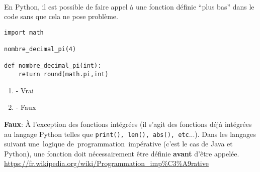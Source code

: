 \begin{Exercice}[2 minutes]\\
En Python, il est possible de faire appel à une fonction définie ``plus bas'' dans le code sans que cela ne pose problème.

\begin{lstlisting}
import math

nombre_decimal_pi(4)

def nombre_decimal_pi(int):
    return round(math.pi,int)
\end{lstlisting}

\begin{enumerate}
    \item - Vrai
    \item - Faux
\end{enumerate}
\begin{solution}
    \textbf{Faux}: À l'exception des fonctions intégrées (il s'agit des fonctions déjà intégrées au langage Python telles que \lstinline{print(), len(), abs(), etc}...). Dans les langages suivant une~logique de~programmation~impérative (c'est le cas de Java et Python), une fonction doit nécessairement être définie \textbf{avant} d'être appelée.
    \url{https://fr.wikipedia.org/wiki/Programmation\_imp\%C3\%A9rative}
\end{solution}
\end{Exercice}


